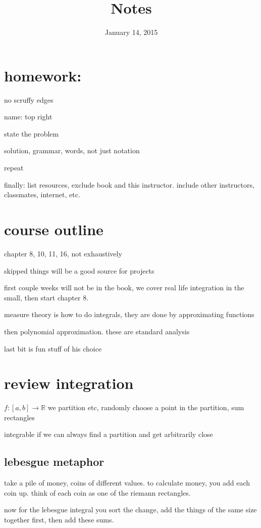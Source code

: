 \documentclass[letterpaper]{article}
\begin{document}
\title{Notes}
\date{January 14, 2015}
\maketitle
\section*{homework:}
no scruffy edges

name: top right

state the problem

solution, grammar, words, not just notation

repeat

finally: list resources, exclude book and this instructor. include other instructors, classmates, internet, etc.

\section*{course outline}
chapter 8, 10, 11, 16, not exhaustively

skipped things will be a good source for projects

first couple weeks will not be in the book, we cover real life integration in the small, then start chapter 8.

measure theory  is how to do integrals, they are done by approximating functions

then polynomial approximation. these are standard analysis

last bit is fun stuff of his choice

\section*{review integration}
$f:[a,b]\to \mathbb{R}$ we partition etc, randomly choose a point in the partition, sum rectangles

integrable if we can always find a partition and get arbitrarily close

\subsection*{lebesgue metaphor}
take a pile of money, coins of different values. to calculate money, you add each coin up. think of each coin as one of the riemann rectangles.

now for the lebesgue integral you sort the change, add the things of the same size together first, then add these sums.
\end{document}
